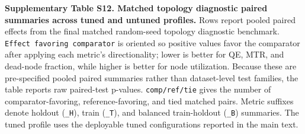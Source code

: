 \documentclass[
]{article}
\providecommand{\DIFadd}[1]{{\protect\color{blue} #1}} %
\begin{document}
\DIFadd{\textbf{Supplementary Table S12. Matched topology diagnostic paired
summaries across tuned and untuned profiles.} Rows report pooled paired
effects from the final matched random-seed topology diagnostic
benchmark. \texttt{Effect\ favoring\ comparator} is oriented so positive
values favor the comparator after applying each metric's directionality;
lower is better for QE, MTR, and dead-node fraction, while higher is
better for node utilization. Because these are pre-specified pooled
paired summaries rather than dataset-level test families, the table
reports raw paired-test p-values. \texttt{comp/ref/tie} gives the number
of comparator-favoring, reference-favoring, and tied matched pairs.
Metric suffixes denote holdout (\texttt{\_H}), train (\texttt{\_T}), and
balanced train-holdout (\texttt{\_B}) summaries. The tuned profile uses
the deployable tuned configurations reported in the main text.
}
\end{document}
